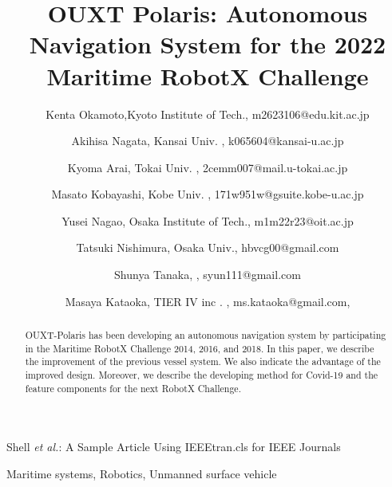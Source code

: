 \documentclass[lettersize,journal]{IEEEtran}
\begin{document}
\title{OUXT Polaris: Autonomous Navigation System for the 2022 Maritime RobotX Challenge}
\author{
    Kenta Okamoto,Kyoto Institute of Tech., m2623106@edu.kit.ac.jp \\ \and
    Akihisa Nagata, Kansai Univ. , k065604@kansai-u.ac.jp \\ \and
    Kyoma Arai, Tokai Univ. , 2cemm007@mail.u-tokai.ac.jp \\ \and
    Masato Kobayashi, Kobe Univ. , 171w951w@gsuite.kobe-u.ac.jp \\ \and
    Yusei Nagao, Osaka Institute of Tech., m1m22r23@oit.ac.jp \\ \and
    Tatsuki Nishimura, Osaka Univ., hbvcg00@gmail.com \\ \and
    Shunya Tanaka, , syun111@gmail.com \\ \and
    Masaya Kataoka, TIER IV inc . , ms.kataoka@gmail.com,
}

%
{Shell \MakeLowercase{\textit{et al.}}: A Sample Article Using IEEEtran.cls for IEEE Journals}


\maketitle

\begin{abstract}
OUXT-Polaris has been developing an autonomous navigation system by participating in the 
Maritime RobotX Challenge 2014, 2016, and 2018. 
In this paper, we describe the improvement of the previous vessel system. 
We also indicate the advantage of the improved design.
Moreover, we describe the developing method for Covid-19 and the 
feature components for the next RobotX Challenge.
\end{abstract}

\begin{IEEEkeywords}
Maritime systems, Robotics, Unmanned surface vehicle
\end{IEEEkeywords}
\end{document}
